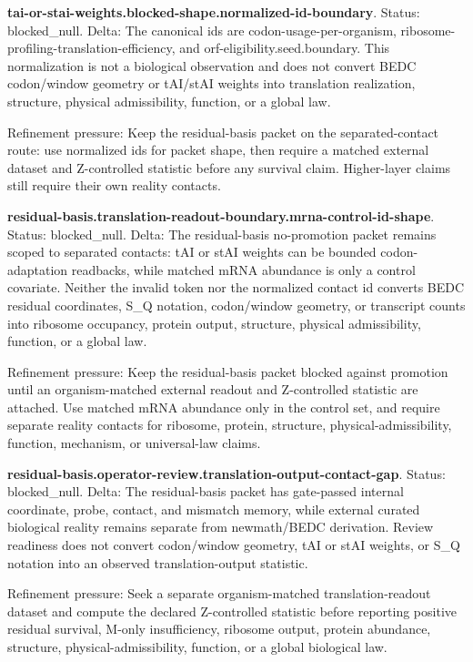\textbf{tai-or-stai-weights.blocked-shape.normalized-id-boundary}. Status: blocked\_null. Delta: The canonical ids are codon-usage-per-organism, ribosome-profiling-translation-efficiency, and orf-eligibility.seed.boundary. This normalization is not a biological observation and does not convert BEDC codon/window geometry or tAI/stAI weights into translation realization, structure, physical admissibility, function, or a global law.

Refinement pressure: Keep the residual-basis packet on the separated-contact route: use normalized ids for packet shape, then require a matched external dataset and Z-controlled statistic before any survival claim. Higher-layer claims still require their own reality contacts.

\textbf{residual-basis.translation-readout-boundary.mrna-control-id-shape}. Status: blocked\_null. Delta: The residual-basis no-promotion packet remains scoped to separated contacts: tAI or stAI weights can be bounded codon-adaptation readbacks, while matched mRNA abundance is only a control covariate. Neither the invalid token nor the normalized contact id converts BEDC residual coordinates, S\_Q notation, codon/window geometry, or transcript counts into ribosome occupancy, protein output, structure, physical admissibility, function, or a global law.

Refinement pressure: Keep the residual-basis packet blocked against promotion until an organism-matched external readout and Z-controlled statistic are attached. Use matched mRNA abundance only in the control set, and require separate reality contacts for ribosome, protein, structure, physical-admissibility, function, mechanism, or universal-law claims.

\textbf{residual-basis.operator-review.translation-output-contact-gap}. Status: blocked\_null. Delta: The residual-basis packet has gate-passed internal coordinate, probe, contact, and mismatch memory, while external curated biological reality remains separate from newmath/BEDC derivation. Review readiness does not convert codon/window geometry, tAI or stAI weights, or S\_Q notation into an observed translation-output statistic.

Refinement pressure: Seek a separate organism-matched translation-readout dataset and compute the declared Z-controlled statistic before reporting positive residual survival, M-only insufficiency, ribosome output, protein abundance, structure, physical-admissibility, function, or a global biological law.

